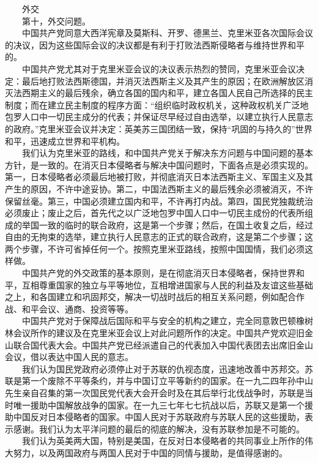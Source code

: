 \documentclass[cn,11pt,chinese]{elegantbook}
\begin{document}
　　外交\\
　　第十，外交问题。\\
　　中国共产党同意大西洋宪章及莫斯科、开罗、德黑兰、克里米亚各次国际会议的决议，因为这些国际会议的决议都是有利于打败法西斯侵略者与维持世界和平的。\\
　　中国共产党尤其对于克里米亚会议的决议表示热烈的赞同，克里米亚会议决定：最后地打败法西斯德国，并消灭法西斯主义及其产生的原因；在欧洲解放区消灭法西期主义的最后残余，确立各国的国内和平，建立各国人民自己所选择的民主制度；而在建立民主制度的程序方面：“组织临时政权机关，这种政权机关广泛地包罗人口中一切民主成分的代表；并保证尽早经过自由选举，以建立执行人民意志的政府。”克里米亚会议并决定：英美苏三国团结一致，保持“巩固的与持久的”世界和平，迅速成立世界和平机构。\\
　　我们认为克里米亚的路线，和中国共产党关于解决东方问题与中国问题的基本方针，是一致的。在消灭日本侵略者与解决中国问题时，下面各点是必须实现的。第一，日本侵略者必须最后地被打败，并彻底消灭日本法西斯主义、军国主义及其产生的原因，不许中途妥协。第二，中国法西斯主义的最后残余必须被消灭，不许保留丝毫。第三，中国必须建立国内和平，不许再打内战。第四，国民党独裁统治必须废止；废止之后，首先代之以广泛地包罗中国人口中一切民主成份的代表所组成的举国一致的临时的联合政府，这是第一个步骤；然后，在国土收复之后，经过自由的无拘束的选举，建立执行人民意志的正式的联合政府，这是第二个步骤；这两个步骤，不许可省掉任何一个。按照克里米亚路线，按照中国国情，我们必须这样做。\\
　　中国共产党的外交政策的基本原则，是在彻底消灭日本侵略者，保持世界和平，互相尊重国家的独立与平等地位，互相增进国家与人民的利益及友谊这些基础之上，和各国建立和巩固邦交，解决一切战时战后的相互关系问题，例如配合作战、和平会议、通商、投资等等。\\
　　中国共产党对于保障战后国际和平与安全的机构之建立，完全同意敦巴顿橡树林会议所作的建议及在克里米亚会议上对此问题所作的决定。中国共产党欢迎旧金山联合国代表大会。中国共产党已经派遣自己的代表加入中国代表团去出席旧金山会议，借以表达中国人民的意志。\\
　　我们认为国民党政府必须停止对于苏联的仇视态度，迅速地改善中苏邦交。苏联是第一个废除不平等条约，并与中国订立平等新约的国家。在一九二四年孙中山先生亲自召集的第一次国民党代表大会开会时及在其后举行北伐战争时，苏联是当时唯一援助中国解放战争的国家。在一九三七年七七抗战以后，苏联又是第一个援助中国反对日本侵略者的国家。中国人民对于苏联政府与苏联人民的这些援助，表示感谢。我们认为太平洋问题的最后的彻底的解决，没有苏联参加是不可能的。\\
　　我们认为英美两大国，特别是美国，在反对日本侵略者的共同事业上所作的伟大努力，以及两国政府与两国人民对于中国的同情与援助，是值得感谢的。\\
\end{document}
